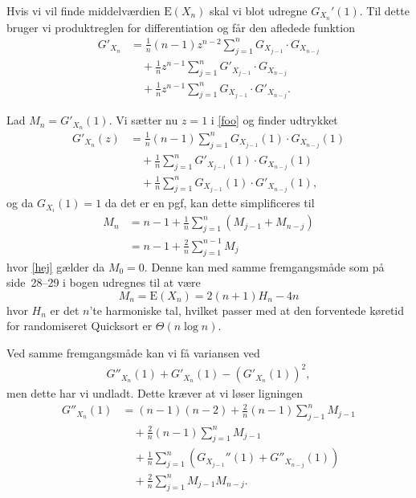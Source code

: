 \documentclass[a4paper]{article}
\begin{document}
Hvis vi vil finde middelværdien $\text{E}(X_n)$ skal vi blot udregne $G_{X_n}'(1)$. Til dette bruger vi produktreglen for differentiation og får den afledede funktion \begin{align}
    G'_{X_n} &= \frac{1}{n}(n-1)z^{n-2} \sum_{j=1}^n G_{X_{j-1}} \cdot G_{X_{n-j}} \nonumber \\
             &\quad + \frac{1}{n}z^{n-1} \sum_{j=1}^n G'_{X_{j-1}} \cdot G_{X_{n-j}} \nonumber \\
\label{foo}  &\quad + \frac{1}{n}z^{n-1} \sum_{j=1}^n G_{X_{j-1}} \cdot G'_{X_{n-j}}.
\end{align}

Lad $M_n=G'_{X_n}(1)$. Vi sætter nu $z=1$ i \eqref{foo} og finder udtrykket \begin{align}
    G'_{X_n}(z) &= \frac{1}{n}(n-1) \sum_{j=1}^n G_{X_{j-1}}(1) \cdot G_{X_{n-j}}(1) \nonumber \\
             &\quad + \frac{1}{n} \sum_{j=1}^n G'_{X_{j-1}}(1) \cdot G_{X_{n-j}}(1) \nonumber \\
             &\quad + \frac{1}{n} \sum_{j=1}^n G_{X_{j-1}}(1) \cdot G'_{X_{n-j}}(1),
\end{align} og da $G_{X_i}(1)=1$ da det er en pgf, kan dette simplificeres til \begin{align}
    M_n &= n-1+ \frac{1}{n} \sum_{j=1}^n (M_{j-1} + M_{n-j}) \\
        &= n-1 + \frac{2}{n} \sum_{j=1}^{n-1} M_j \label{hej}
\end{align} hvor \eqref{hej} gælder da $M_0=0$. Denne kan med samme fremgangsmåde som på side~28--29 i bogen udregnes til at være \begin{equation}
    M_n = \text{E}(X_n) = 2(n+1)H_n - 4n
\end{equation} hvor $H_n$ er det $n$'te harmoniske tal, hvilket passer med at den forventede køretid for randomiseret Quicksort er $\Theta(n \log n)$.

Ved samme fremgangsmåde kan vi få variansen ved \begin{align}
    G''_{X_n}(1) + G'_{X_n}(1) - (G'_{X_n}(1))^2,
\end{align} men dette har vi undladt. Dette kræver at vi løser ligningen \begin{align}
    G''_{X_n}(1) &= (n-1)(n-2)+\frac{2}{n}(n-1) \sum_{j-1}^n M_{j-1} \nonumber \\
                 &\quad + \frac{2}{n}(n-1) \sum_{j=1}^n M_{j-1} \nonumber \\
                 &\quad + \frac{1}{n} \sum_{j=1}^n \left( G_{X_{j-1}}''(1) + G''_{X_{n-j}}(1) \right) \nonumber \\
                 &\quad + \frac{2}{n} \sum_{j=1}^n M_{j-1}M_{n-j}.
\end{align}
\end{document}
